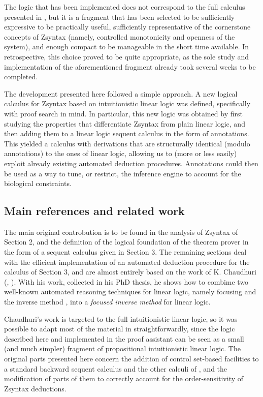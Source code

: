 The logic that has been implemented does not correspond to the full calculus
presented in \cite{adding-logic}, but it is a fragment that has been selected to
be sufficiently expressive to be practically useful, sufficiently representative
of the cornerstone concepts of Zsyntax (namely, controlled monotonicity and
openness of the system), and enough compact to be manageable in the short time
available. In retrospective, this choice proved to be quite appropriate, as the
sole study and implementation of the aforementioned fragment already took
several weeks to be completed.

The development presented here followed a simple approach. A new logical
calculus for Zsyntax based on intuitionistic linear logic was defined,
specifically with proof search in mind. In particular, this new logic was
obtained by first studying the properties that differentiate Zsyntax from plain
linear logic, and then adding them to a linear logic sequent calculus in the
form of annotations.  This yielded a calculus with derivations that are
structurally identical (modulo annotations) to the ones of linear logic,
allowing us to (more or less easily) exploit already existing automated
deduction procedures. Annotations could then be used as a way to tune, or
restrict, the inference engine to account for the biological constraints.

\subsection{Main references and related work}

The main original controbution is to be found in the analysis of Zsyntax of
Section 2, and the definition of the logical foundation of the theorem prover in
the form of a sequent calculus given in Section 3.  The remaining sections deal
with the efficient implementation of an automated deduction procedure for the
calculus of Section 3, and are almost entirely based on the work of K. Chaudhuri
(\cite{chaudhuri-paper}, \cite{chaudhuri-thesis}). With his work, collected in
his PhD thesis, he shows how to combime two well-known automated reasoning
techniques for linear logic, namely focusing \cite{andreoli92} and the inverse
method \cite{inverse}, into a \emph{focused inverse method} for linear logic.

Chaudhuri's work is targeted to the full intuitionistic linear logic, so it was
possible to adapt most of the material in \cite{chaudhuri-thesis}
straightforwardly, since the logic described here and implemented in the proof
assistant can be seen as a small (and much simpler) fragment of propositional
intuitionistic linear logic. The original parts presented here concern the
addition of control set-based facilities to a standard backward sequent calculus
and the other calculi of \cite{chaudhuri-thesis}, and the modification of parts
of them to correctly account for the order-sensitivity of Zsyntax deductions.

